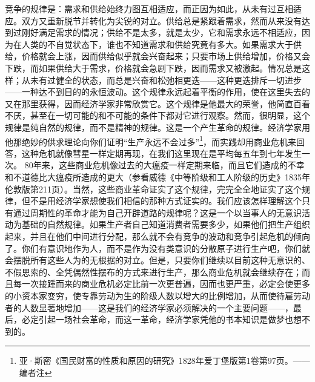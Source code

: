 \documentclass[a4paper,twoside,12pt]{ctexart}
\begin{document}
竞争的规律是：需求和供给始终力图互相适应，而正因为如此，从未有过互相适应。双方又重新脱节并转化为尖锐的对立。供给总是紧跟着需求，然而从来没有达到过刚好满足需求的情况；供给不是太多，就是太少，它和需求永远不相适应，因为在人类的不自觉状态下，谁也不知道需求和供给究竟有多大。如果需求大于供给，价格就会上涨，因而供给似乎就会兴奋起来；只要市场上供给增加，价格又会下跌，而如果供给大于需求，价格就会急剧下跌，因而需求又被激起。情况总是这样；从未有过健全的状态，而总是兴奋和松弛相更迭——这种更迭排斥一切进步——一种达不到目的的永恒波动。这个规律永远起着平衡的作用，使在这里失去的又在那里获得，因而经济学家非常欣赏它。这个规律是他最大的荣誉，他简直百看不厌，甚至在一切可能的和不可能的条件下都对它进行观察。然而，很明显，这个规律是纯自然的规律，而不是精神的规律。这是一个产生革命的规律。经济学家用他那绝妙的供求理论向你们证明“生产永远不会过多”\footnote{亚·斯密《国民财富的性质和原因的研究》1828年爱丁堡版第1卷第97页。——编者注}，而实践却用商业危机来回答，这种危机就像彗星一样定期再现，在我们这里现在是平均每五年到七年发生一次。 80年来，这些商业危机像过去的大瘟疫一样定期来临，而且它们造成的不幸和不道德比大瘟疫所造成的更大（参看威德《中等阶级和工人阶级的历史》1835年伦敦版第211页）。当然，这些商业革命证实了这个规律，完完全全地证实了这个规律，但不是用经济学家想使我们相信的那种方式证实的。我们应该怎样理解这个只有通过周期性的革命才能为自己开辟道路的规律呢？这是一个以当事人的无意识活动为基础的自然规律。如果生产者自己知道消费者需要多少，如果他们把生产组织起来，并且在他们中间进行分配，那么就不会有竞争的波动和竞争引起危机的倾向了。你们有意识地作为人，而不是作为没有类意识的分散原子进行生产吧，你们就会摆脱所有这些人为的无根据的对立。但是，只要你们继续以目前这种无意识的、不假思索的、全凭偶然性摆布的方式来进行生产，那么商业危机就会继续存在；而且每一次接踵而来的商业危机必定比前一次更普遍，因而也更严重，必定会使更多的小资本家变穷，使专靠劳动为生的阶级人数以增大的比例增加，从而使待雇劳动者的人数显著地增加——这是我们的经济学家必须解决的一个主要问题——，最后，必定引起一场社会革命，而这一革命，经济学家凭他的书本知识是做梦也想不到的。
\end{document}
